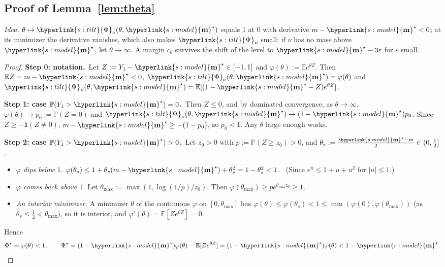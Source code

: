 \documentclass[10pt]{article}
\newcommand{\sy}[2]{{\hyperlink{#1}{#2}}}
\newcommand{\E}{\mathbb{E}}
\newcommand{\PP}{\mathbb{P}}
\newcommand{\1}{\mathbf{1}}
\newcommand{\m}{\sy{s:model}{\mathbf{m}}}
\newcommand{\Phis}{\sy{s:tilt}{\Phi}}
\newcommand{\Psis}{\sy{s:tilt}{\Psi}}
\newcommand{\stp}[2]{\par\medskip\noindent\textbf{Step #1: #2.}\ }
\begin{document}
\subsection{Proof of Lemma~\ref{lem:theta}}\label{sec:pf-lem:theta}
\noindent\emph{Idea.} $\theta\mapsto\Phis_\nu(\theta,\m^\star)$ equals $1$ at $0$ with derivative $m-\m^\star<0$; at its minimizer the derivative vanishes, which also
makes $\Psis_\nu$ small; if $\nu$ has no mass above $\m^\star$, let $\theta\to\infty$. A margin $c_\theta$ survives the shift of the level to $\m^\star-3\varepsilon$ for
$\varepsilon$ small.
\begin{proof}
\stp0{notation}Let $Z:=Y_1-\m^\star\in[-1,1]$ and $\varphi(\theta):=\E e^{\theta Z}$. Then $\E Z=m-\m^\star<0$, $\Phis_\nu(\theta,\m^\star)=\varphi(\theta)$ and
$\Psis_\nu(\theta,\m^\star)=\E[(1-\m^\star-Z)e^{\theta Z}]$.

\stp1{case $\PP(Y_1>\m^\star)=0$}Then $Z\le0$, and by dominated convergence, as $\theta\to\infty$, $\varphi(\theta)\to p_0:=\PP(Z=0)$ and $\Psis_\nu(\theta,\m^\star)\to(1-\m^\star)p_0$.
Since $Z\ge-\1(Z\ne0)$, $m-\m^\star\ge-(1-p_0)$, so $p_0<1$. Any $\theta$ large enough works.

\stp2{case $\PP(Y_1>\m^\star)>0$}Let $z_0>0$ with $p:=\PP(Z\ge z_0)>0$, and $\theta_s:=\frac{\m^\star-m}2\in(0,\frac12]$.
\begin{itemize}
\item \emph{$\varphi$ dips below $1$.} $\varphi(\theta_s)\le1+\theta_s(m-\m^\star)+\theta_s^2=1-\theta_s^2<1$. \ (Since $e^u\le1+u+u^2$ for $|u|\le1$.)
\item \emph{$\varphi$ comes back above $1$.} Let $\theta_{\max}:=\max(1,\log(1/p)/z_0)$. Then $\varphi(\theta_{\max})\ge pe^{\theta_{\max}z_0}\ge1$.
\item \emph{An interior minimizer.} A minimizer $\theta$ of the continuous $\varphi$ on $[0,\theta_{\max}]$ has $\varphi(\theta)\le\varphi(\theta_s)<1\le\min(\varphi(0),\varphi(\theta_{\max}))$ (as
$\theta_s\le\frac12<\theta_{\max}$), so it is interior, and $\varphi'(\theta)=\E[Ze^{\theta Z}]=0$.
\end{itemize}
Hence
\[
\Phi^\star=\varphi(\theta)<1,\qquad\Psi^\star=(1-\m^\star)\varphi(\theta)-\E[Ze^{\theta Z}]=(1-\m^\star)\varphi(\theta)<1-\m^\star .
\]


\end{proof}
\end{document}

